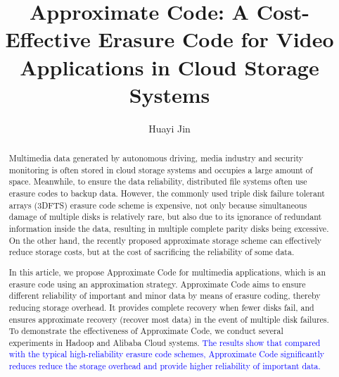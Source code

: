\documentclass[sigconf]{acmart}
\begin{document}
\title{Approximate Code: A Cost-Effective Erasure Code for Video Applications in Cloud Storage Systems}

\author{Huayi Jin}



\begin{abstract}
Multimedia data generated by autonomous driving, media industry and security monitoring is often stored in cloud storage systems and occupies a large amount of space. Meanwhile, to ensure the data reliability, distributed file systems often use erasure codes to backup data. However, the commonly used triple disk failure tolerant arrays (3DFTS) erasure code scheme is expensive, not only because simultaneous damage of multiple disks is relatively rare, but also due to its ignorance of redundant information inside the data, resulting in multiple complete parity disks being excessive. On the other hand, the recently proposed approximate storage scheme can effectively reduce storage costs, but at the cost of sacrificing the reliability of some data.

In this article, we propose Approximate Code for multimedia applications, which is an erasure code using an approximation strategy. Approximate Code aims to ensure different reliability of important and minor data by means of erasure coding, thereby reducing storage overhead. It provides complete recovery when fewer disks fail, and ensures approximate recovery (recover most data) in the event of multiple disk failures. To demonstrate the effectiveness of Approximate Code, we conduct several experiments in Hadoop and Alibaba Cloud systems. 
\textcolor{blue}{The results show that compared with the typical high-reliability erasure code schemes, Approximate Code significantly reduces reduce the storage overhead and provide higher reliability of important data.} 

\end{abstract}

%
%
\end{document}

